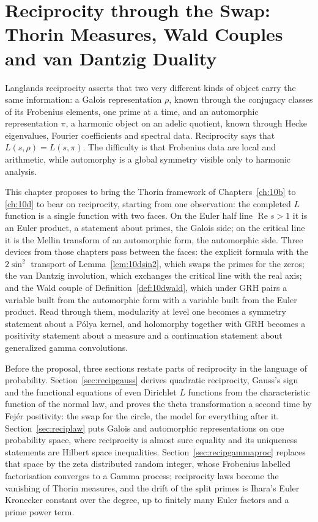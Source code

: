 \chapter[Reciprocity through the Swap]{Reciprocity through the Swap:\\ Thorin Measures, Wald Couples\\ and van Dantzig Duality}\label{ch:recip}

Langlands reciprocity asserts that two very different kinds of object carry the same information: a Galois representation $\rho$, known through the conjugacy classes of its Frobenius elements, one prime at a time, and an automorphic representation $\pi$, a harmonic object on an adelic quotient, known through Hecke eigenvalues, Fourier coefficients and spectral data. Reciprocity says that $L(s,\rho)=L(s,\pi)$. The difficulty is that Frobenius data are local and arithmetic, while automorphy is a global symmetry visible only to harmonic analysis.

This chapter proposes to bring the Thorin framework of Chapters~\ref{ch:10b} to \ref{ch:10d} to bear on reciprocity, starting from one observation: the completed $L$ function is a single function with two faces. On the Euler half line $\operatorname{Re}s>1$ it is an Euler product, a statement about primes, the Galois side; on the critical line it is the Mellin transform of an automorphic form, the automorphic side. Three devices from those chapters pass between the faces: the explicit formula with the $2\sin^2$ transport of Lemma~\ref{lem:10dsin2}, which swaps the primes for the zeros; the van Dantzig involution, which exchanges the critical line with the real axis; and the Wald couple of Definition~\ref{def:10dwald}, which under GRH pairs a variable built from the automorphic form with a variable built from the Euler product. Read through them, modularity at level one becomes a symmetry statement about a P\'olya kernel, and holomorphy together with GRH becomes a positivity statement about a measure and a continuation statement about generalized gamma convolutions.

Before the proposal, three sections restate parts of reciprocity in the language of probability. Section~\ref{sec:recipgauss} derives quadratic reciprocity, Gauss's sign and the functional equations of even Dirichlet $L$ functions from the characteristic function of the normal law, and proves the theta transformation a second time by Fej\'er positivity: the swap for the circle, the model for everything after it. Section~\ref{sec:reciplaw} puts Galois and automorphic representations on one probability space, where reciprocity is almost sure equality and its uniqueness statements are Hilbert space inequalities. Section~\ref{sec:recipgammaproc} replaces that space by the zeta distributed random integer, whose Frobenius labelled factorisation converges to a Gamma process; reciprocity laws become the vanishing of Thorin measures, and the drift of the split primes is Ihara's Euler Kronecker constant over the degree, up to finitely many Euler factors and a prime power term.

